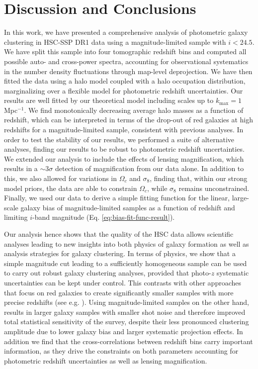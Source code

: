 \documentclass[a4paper,11pt]{article}
\begin{document}
\section{Discussion and Conclusions}\label{sec:discussion}
  In this work, we have presented a comprehensive analysis of photometric galaxy clustering in HSC-SSP DR1 data using a magnitude-limited sample with $i<24.5$. We have split this sample into four tomographic redshift bins and computed all possible auto- and cross-power spectra, accounting for observational systematics in the number density fluctuations through map-level deprojection. We have then fitted the data using a halo model coupled with a halo occupation distribution, marginalizing over a flexible model for photometric redshift uncertainties. Our results are well fitted by our theoretical model including scales up to $k_{\mathrm{max}} = 1$ Mpc$^{-1}$. We find monotonically decreasing average halo masses as a function of redshift, which can be interpreted in terms of the drop-out of red galaxies at high redshifts for a magnitude-limited sample, consistent with previous analyses. In order to test the stability of our results, we performed a suite of alternative analyses, finding our results to be robust to photometric redshift uncertainties. We extended our analysis to include the effects of lensing magnification, which results in a $\sim 3 \sigma$ detection of magnification from our data alone. In addition to this, we also allowed for variations in $\Omega_{c}$ and $\sigma_{8}$, finding that, within our strong model priors, the data are able to constrain $\Omega_{c}$, while $\sigma_{8}$ remains unconstrained. Finally, we used our data to derive a simple fitting function for the linear, large-scale galaxy bias of magnitude-limited samples as a function of redshift and limiting $i$-band magnitude (Eq. \ref{eq:bias-fit-func-result}).

  Our analysis hence shows that the quality of the HSC data allows scientific analyses leading to new insights into both physics of galaxy formation as well as analysis strategies for galaxy clustering. In terms of physics, we show that a simple magnitude cut leading to a sufficiently homogeneous sample can be used to carry out robust galaxy clustering analyses, provided that photo-$z$ systematic uncertainties can be kept under control. This contrasts with other approaches that focus on red galaxies to create significantly smaller samples with more precise redshifts (see e.g. \cite{1507.05460,1807.10163}). Using magnitude-limited samples on the other hand, results in larger galaxy samples with smaller shot noise and therefore improved total statistical sensitivity of the survey, despite their less pronounced clustering amplitude due to lower galaxy bias and larger systematic projection effects. In addition we find that the cross-correlations between redshift bins carry important information, as they drive the constraints on both parameters accounting for photometric redshift uncertainties as well as lensing magnification.
\end{document}
